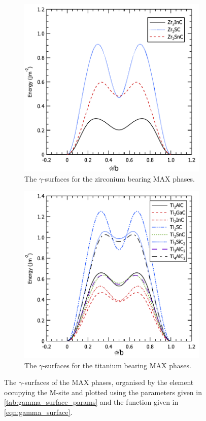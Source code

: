 \begin{figure}
\begin{subfigure}{5cm}
\includegraphics[width=\textwidth]{Zr_gamma_surfaces}
\caption{The $\gamma$-surfaces for the zirconium bearing MAX phases.\label{fig:Zr_gamma_surfaces}}
\end{subfigure}

\begin{subfigure}{5cm}
\centering
\includegraphics[width=\textwidth]{Ti_gamma_surfaces}
\caption{The $\gamma$-surfaces for the titanium bearing MAX phases.\label{fig:Ti_gamma_surfaces}}
\end{subfigure}

\captionsetup{width=12cm}
\caption{The $\gamma$-surfaces of the MAX phases, organised by the element occupying the M-site and plotted using the parameters given in \autoref{tab:gamma_surface_params} and the function given in \autoref{eqn:gamma_surface}. \label{fig:gamma_surfaces}}
\end{figure}


